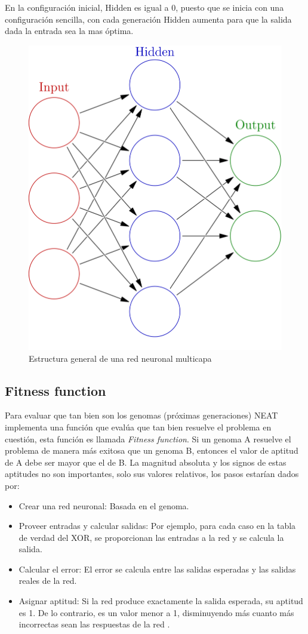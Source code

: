 \documentclass[lettersize, journal]{IEEEtran}
\begin{document}
En la configuración inicial, Hidden es igual a 0, puesto que se inicia con una configuración sencilla, con cada generación Hidden aumenta para que la salida dada la entrada sea la mas óptima.

\begin{figure}
    \centering    \includegraphics[width=0.5\linewidth]{images/neural_network.png}
    \caption{Estructura general de una red neuronal multicapa \cite{red_neuronal}}
    \label{fig:Red-neuronal}
\end{figure}

\subsection{Fitness function}
Para evaluar que tan bien son los genomas (próximas generaciones) NEAT implementa una función que evalúa que tan bien resuelve el problema en cuestión, esta función es llamada \textit{Fitness function}. Si un genoma A resuelve el problema de manera más exitosa que un genoma B, entonces el valor de aptitud de A debe ser mayor que el de B. La magnitud absoluta y los signos de estas aptitudes no son importantes, solo sus valores relativos, los pasos estarían dados por:
\begin{itemize}
    \item Crear una red neuronal: Basada en el genoma.
    \item Proveer entradas y calcular salidas: Por ejemplo, para cada caso en la tabla de verdad del XOR, se proporcionan las entradas a la red y se calcula la salida.
    \item Calcular el error: El error se calcula entre las salidas esperadas y las salidas reales de la red.
    \item Asignar aptitud: Si la red produce exactamente la salida esperada, su aptitud es 1. De lo contrario, es un valor menor a 1, disminuyendo más cuanto más incorrectas sean las respuestas de la red \cite{neat_python}.
\end{itemize}
\end{document}
